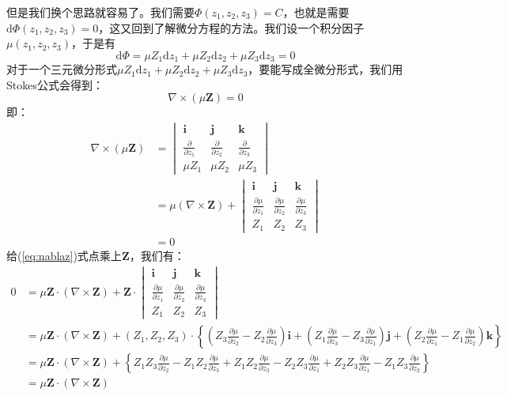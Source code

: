 \documentclass[UTF8]{ctexart}
\newcommand{\md}{\mathrm{d}}
\numberwithin{equation}{subsection}
\begin{document}
但是我们换个思路就容易了。我们需要$\Phi(z_1,z_2,z_3)=C$，也就是需要$\md\Phi(z_1,z_2,z_3)=0$，这又回到了解微分方程的方法。我们设一个积分因子$\mu(z_1,z_2,z_3)$，于是有
\[ \md\Phi=\mu Z_1\md z_1 +\mu Z_2\md z_2+\mu Z_3\md z_3=0 \]
对于一个三元微分形式$\mu Z_1\md z_1 +\mu Z_2\md z_2+\mu Z_3\md z_3$，要能写成全微分形式，我们用Stokes公式会得到：
\begin{equation}\label{stokes}
\nabla\times(\mu\bm{Z})=0
\end{equation}
即：
\begin{align}
\nabla\times(\mu\bm{Z})&=\begin{vmatrix}
\bm{i}	& \bm{j} & \bm{k} \\ 
\frac{\partial}{\partial z_1}	& \frac{\partial}{\partial z_2} & \frac{\partial}{\partial z_3} \\ 
\mu Z_1	& \mu Z_2 & \mu Z_3
\end{vmatrix}\\
\label{eq:nablaz}&=\mu(\nabla\times\bm{Z})+
\begin{vmatrix}
\bm{i}	& \bm{j} & \bm{k} \\ 
\frac{\partial \mu}{\partial z_1}	& \frac{\partial\mu}{\partial z_2} & \frac{\partial\mu}{\partial z_3} \\ 
Z_1& Z_2 &Z_3 
\end{vmatrix}\\
&=0
\end{align}
给(\ref{eq:nablaz})式点乘上$\bm{Z}$，我们有：
\begin{align*}
0&=\mu\bm{Z}\cdot(\nabla\times\bm{Z})+\bm{Z}\cdot\begin{vmatrix}
\bm{i}	& \bm{j} & \bm{k} \\ 
\frac{\partial \mu}{\partial z_1}	& \frac{\partial\mu}{\partial z_2} & \frac{\partial\mu}{\partial z_3} \\ 
Z_1& Z_2 &Z_3 
\end{vmatrix}\\
&=\mu\bm{Z}\cdot(\nabla\times\bm{Z})+
(Z_1,Z_2,Z_3)\cdot\left\lbrace \left( Z_3 \frac{\partial\mu}{\partial z_2}-Z_2\frac{\partial\mu}{\partial z_3}\right)\bm{i}
+
\left( Z_1 \frac{\partial\mu}{\partial z_3}-Z_3\frac{\partial\mu}{\partial z_1}\right)\bm{j}
+
\left( Z_2 \frac{\partial\mu}{\partial z_1}-Z_1\frac{\partial\mu}{\partial z_2}\right)\bm{k}\right\rbrace 
\\
&=\mu\bm{Z}\cdot(\nabla\times\bm{Z})+\left\lbrace Z_1Z_3 \frac{\partial\mu}{\partial z_2}-Z_1Z_2\frac{\partial\mu}{\partial z_3}
+Z_1Z_2 \frac{\partial\mu}{\partial z_3}-Z_2Z_3\frac{\partial\mu}{\partial z_1}
+
Z_2Z_3 \frac{\partial\mu}{\partial z_1}-Z_1Z_3\frac{\partial\mu}{\partial z_2}\right\rbrace \\
&=\mu\bm{Z}\cdot(\nabla\times\bm{Z})
\end{align*}
\end{document}
